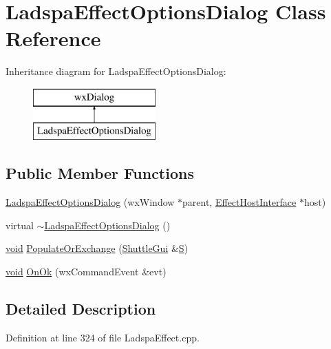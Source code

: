 \hypertarget{class_ladspa_effect_options_dialog}{}\section{Ladspa\+Effect\+Options\+Dialog Class Reference}
\label{class_ladspa_effect_options_dialog}
Inheritance diagram for Ladspa\+Effect\+Options\+Dialog\+:\begin{figure}[H]
\begin{center}
\leavevmode
\includegraphics[height=2.000000cm]{class_ladspa_effect_options_dialog}
\end{center}
\end{figure}
\subsection*{Public Member Functions}
\begin{DoxyCompactItemize}
\item 
\hyperlink{class_ladspa_effect_options_dialog_a1683322c1154d33870703e3d9adf7b38}{Ladspa\+Effect\+Options\+Dialog} (wx\+Window $\ast$parent, \hyperlink{class_effect_host_interface}{Effect\+Host\+Interface} $\ast$host)
\item 
virtual \hyperlink{class_ladspa_effect_options_dialog_a7ede8358cbd76db60e95f8f8433e173a}{$\sim$\+Ladspa\+Effect\+Options\+Dialog} ()
\item 
\hyperlink{sound_8c_ae35f5844602719cf66324f4de2a658b3}{void} \hyperlink{class_ladspa_effect_options_dialog_aa0406c18677f88151d0b517d8ab008e7}{Populate\+Or\+Exchange} (\hyperlink{class_shuttle_gui}{Shuttle\+Gui} \&\hyperlink{xlftab_8c_af933676109efed7ab34cea71d748a517}{S})
\item 
\hyperlink{sound_8c_ae35f5844602719cf66324f4de2a658b3}{void} \hyperlink{class_ladspa_effect_options_dialog_aad463cf393ec86159108af9863aae152}{On\+Ok} (wx\+Command\+Event \&evt)
\end{DoxyCompactItemize}


\subsection{Detailed Description}


Definition at line 324 of file Ladspa\+Effect.\+cpp.



